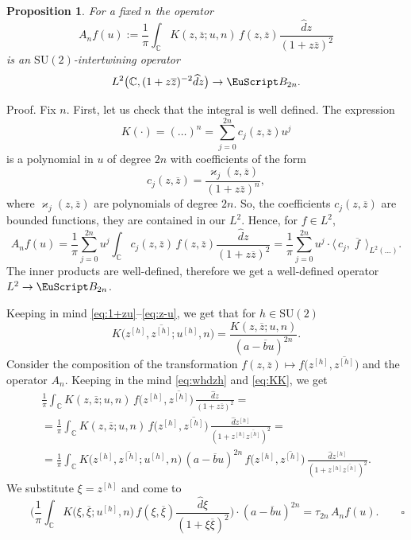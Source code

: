 \documentclass[]{amsart}
\newtheorem{proposition}[theorem]{Proposition}
\def\SU{\mathrm {SU}}
\def\kappa{\varkappa}
\def\la{\langle}
\def\ra{\rangle}
\def\cB{\EuScript B}
\def\C {{\mathbb C }}
\def\ov{\overline}
\def\wh{\widehat}
\def\sm{\smallskip}
\begin{document}
\begin{proposition}
\label{pr:intertwiner}
For a fixed $n$ the operator
\begin{equation}
A_n f(u):= \frac1\pi\int_\C K(z, \ov z; u,n)\, 
f(z,\ov z)\frac{\wh d z}{(1+z\ov z)^2}
\label{eq:A-n}
\end{equation}
is an $\SU(2)$-intertwining operator
$$
L^2\bigl(\C,(1+z\ov z)^{-2} \wh d z\bigr)\to \cB_{2n}
.$$
\end{proposition}

{\sc Proof.} Fix $n$.
First, let us check that the integral is well defined. 
 The expression 
$$
K(\cdot)=(\dots)^n=\sum_{j=0}^{2n}
c_j(z,\ov z)  u^j
$$
is a polynomial in $u$ of degree $2n$
with coefficients of the form
$$
c_j(z,\ov z)= \frac{\kappa_j(z,\ov z)}
{(1+z\ov z)^n}
,$$
where $\kappa_j(z,\ov z)$ are polynomials
of degree $2n$. So, the coefficients $c_j(z,\ov z)$
are bounded functions, they are contained in our $L^2$.
Hence, for $f\in L^2$,
$$
A_n f(u)=\frac1\pi\sum_{j=0}^{2n} u^j\int_\C c_j(z,\ov z)\, f(z,\ov z)
\frac{\wh d z}{(1+z\ov z)^2}=\frac1\pi\sum_{j=0}^{2n} u^j\cdot
\bigl\la\, c_j,\ov {\phantom{.}f \phantom{.}}\, \bigr\ra_{L^2(\dots)}.
$$
The inner products are well-defined,  therefore we get a well-defined operator $L^2\to \cB_{2n}$.



\sm

Keeping in  mind \eqref{eq:1+zu}--\eqref{eq:z-u}, we get
that for $h\in\SU(2)$
\begin{equation}
K\bigl(z^{[h]}, \ov {z^{[h]}};u^{[h]},n\bigr)
=\frac{ K(z,\ov z; u,n)}{(a-\ov b u)^{2n}} 
.
\label{eq:KK}
\end{equation}
Consider the composition of the transformation
$f(z,\ov z)\mapsto f\bigl(z^{[h]}, \ov{z^{[h]}}\bigr)$
and the operator $A_n$.
Keeping in the mind   \eqref{eq:whdzh} and \eqref{eq:KK},
we get
\begin{multline*}
\frac1\pi\int_\C K(z,\ov z;u,n)\, f\bigl(z^{[h]}, \ov{z^{[h]}}\bigr)\,
\frac{\wh d z}{(1+z \ov z)^2}
=\\=
\frac1\pi\int_\C K(z,\ov z;u,n)\,f\bigl(z^{[h]}, \ov{z^{[h]}}\bigr)
\,
\frac{\wh d z^{[h]}}{(1+z^{[h]} \ov {z^{[h]}})^2}
=\\=
\frac1\pi\int_\C 
K\bigl(z^{[h]} ,\ov {z^{[h]}} ;u^{[h]} ,n\bigr)\,
(a-\ov b u)^{2n}\,
f\bigl(z^{[h]}, \ov{z^{[h]}}\bigr)\,
\frac{\wh d z^{[h]}}{(1+z^{[h]} \ov {z^{[h]}})^2}.
\end{multline*}
We substitute $\xi=z^{[h]}$ and come to
$$
\qquad
\biggl(\frac1\pi\int_\C 
K\bigl(\xi ,\ov \xi ;u^{[h]} ,n\bigr)\,
f(\xi, \ov \xi)
\frac{\wh d \xi}{(1+\xi \ov \xi)^2}\biggr)
\cdot (a-\ov b u)^{2n}=
\tau_{2n} \, A_n f(u).
\qquad
\square
$$
\end{document}
